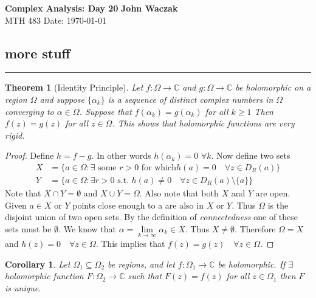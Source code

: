 \documentclass[a4paper, 11pt]{article}
\newtheorem*{theorem}{Theorem}
\newtheorem*{corollary}{Corollary}
\begin{document}
\noindent
\large\textbf{Complex Analysis: Day 20} \hfill \textbf{John Waczak} \\
\normalsize MTH 483 \hfill  Date: \today \\


\subsection*{more stuff} 
	\par\noindent\rule{\textwidth}{0.4pt}
	\begin{theorem}[Identity Principle]
		Let $f:\Omega\to\mathbb{C}$ and $g:\Omega\to\mathbb{C}$ be holomorphic on a region $\Omega$ and suppose $\{\alpha_k\}$ is a sequence of distinct complex numbers in $\Omega$ converging to $\alpha \in \Omega$. Suppose that $f(\alpha_k)=g(\alpha_k)$ for all $k\geq 1$ Then $f(z)=g(z)$ for all $z\in\Omega$. This shows that holomorphic functions are very rigid. 	
	\end{theorem}
	
	\begin{proof}
		Define $h = f-g$. In other words $h(\alpha_k) = 0$ $\forall k$. Now define two sets
			\begin{align*}
				X &= \{a\in\Omega : \exists \text{ some } r>0 \text{ for which} h(a)=0 \quad \forall z\in D_R(a)\}\\ 
				Y &= \{a\in\Omega : \exists r>0 \text{ s.t. } h(a)\neq 0 \quad \forall z\in D_R(a)\setminus\{a\}\}
			\end{align*}
		Note that $X\cap Y = \emptyset$ and $X\cup Y = \Omega$. Also note that both $X$ and $Y$ are open. Given $a\in X \text{ or } Y$ points close enough to a are also in $X$ or $Y$. Thus $\Omega$ is the disjoint union of two open sets. By the definition of \textit{connectedness} one of these sets must be $\emptyset$. We know that $\alpha = \lim\limits_{k\to\infty} \alpha_k \in X$. Thus $X\neq \emptyset$. Therefore $\Omega = X$ and $h(z)=0 \quad \forall z\in\Omega$. This implies that $f(z)=g(z) \quad \forall z \in \Omega$. 
	\end{proof}

	\begin{corollary}
		Let $\Omega_1 \subseteq \Omega_2$ be regions, and let $f:\Omega_1\to\mathbb{C}$ be holomorphic. If $\exists$ holomorphic function $F:\Omega_2\to\mathbb{C}$ such that $F(z)=f(z)$ for all $z\in\Omega_1$ then $F$ is unique. 
	\end{corollary}
		
\end{document}
